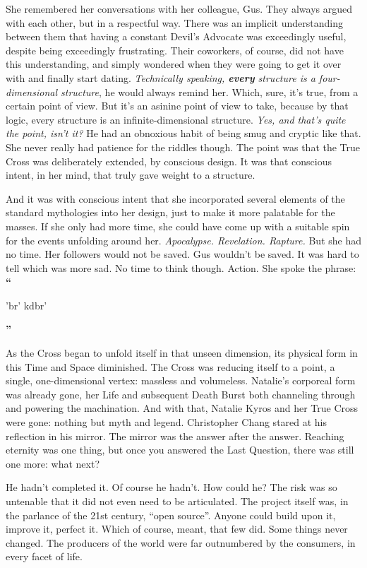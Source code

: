 She remembered her conversations with her colleague, Gus. They always argued with each other, but in a respectful way. There was an implicit understanding between them that having a constant Devil’s Advocate was exceedingly useful, despite being exceedingly frustrating. Their coworkers, of course, did not have this understanding, and simply wondered when they were going to get it over with and finally start dating.
\SmallVSpace
\emph{Technically speaking, \textbf{every} structure is a four-dimensional structure}, he would always remind her. Which, sure, it’s true, from a certain point of view. But it’s an asinine point of view to take, because by that logic, every structure is an infinite-dimensional structure. \emph{Yes, and that’s quite the point, isn’t it?}
\SmallVSpace
He had an obnoxious habit of being smug and cryptic like that. She never really had patience for the riddles though. The point was that the True Cross was deliberately extended, by conscious design. It was that conscious intent, in her mind, that truly gave weight to a structure.

And it was with conscious intent that she incorporated several elements of the standard mythologies into her design, just to make it more palatable for the masses. If she only had more time, she could have come up with a suitable spin for the events unfolding around her. \emph{Apocalypse. Revelation. Rapture.}
\SmallVSpace
But she had no time. Her followers would not be saved. Gus wouldn’t be saved. It was hard to tell which was more sad. No time to think though. Action. She spoke the phrase:
\SmallVSpace
‎‎\textbf{``}\begin{cjhebrew}'br' kdbr'\end{cjhebrew}\textbf{''}
\SmallVSpace

As the Cross began to unfold itself in that unseen dimension, its physical form in this Time and Space diminished. The Cross was reducing itself to a point, a single, one-dimensional vertex: massless and volumeless. Natalie’s corporeal form was already gone, her Life and subsequent Death Burst both channeling through and powering the machination.
\SomeVSpace
And with that, Natalie Kyros and her True Cross were gone: nothing but myth and legend.
\simpleline
{}
Christopher Chang stared at his reflection in his mirror. The mirror was the answer after the answer. Reaching eternity was one thing, but once you answered the Last Question, there was still one more: what next?

He hadn’t completed it. Of course he hadn’t. How could he? The risk was so untenable that it did not even need to be articulated. The project itself was, in the parlance of the 21st century, “open source”. Anyone could build upon it, improve it, perfect it. Which of course, meant, that few did. Some things never changed. The producers of the world were far outnumbered by the consumers, in every facet of life.

